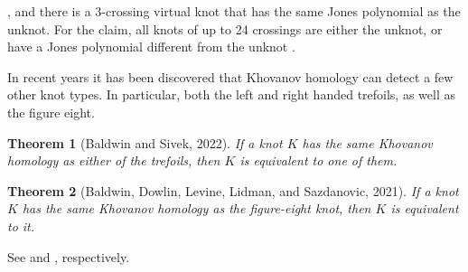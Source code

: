 \documentclass{article}
\theoremstyle{plain}
\newtheorem{theorem}{Theorem}
\begin{document}
        \cite{Thistlethwaite2001LINKSWT}, and there is a 3-crossing virtual
        knot that has the same Jones polynomial as the unknot. For the claim,
        all knots of up to 24 crossings are either the unknot, or have a
        Jones polynomial different from the unknot
        \cite{VerificationUnknotJonesConjUpTo24}.
        \par\hfill\par
        In recent years it has been discovered that Khovanov homology can detect
        a few other knot types. In particular, both the left and right handed
        trefoils, as well as the figure eight.
        \begin{theorem}[Baldwin and Sivek, 2022]
            If a knot $K$ has the same Khovanov homology as either of the
            trefoils, then $K$ is equivalent to one of them.
        \end{theorem}
        \begin{theorem}[Baldwin, Dowlin, Levine, Lidman, and Sazdanovic, 2021]
            If a knot $K$ has the same Khovanov homology as the figure-eight
            knot, then $K$ is equivalent to it.
        \end{theorem}
        See \cite{BaldwinSivekKhovanovTrefoils} and
        \cite{BaldwinDowlinKhovanovFigureEight}, respectively.
\end{document}
